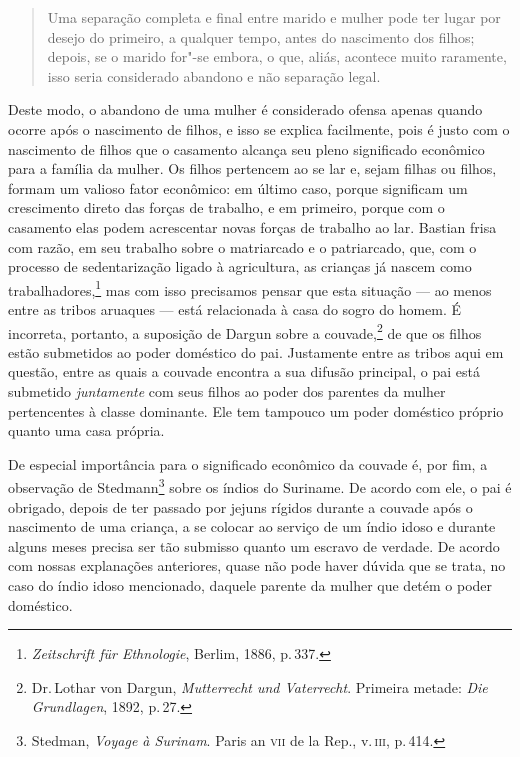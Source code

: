 \begin{quote}
Uma separação completa e
final entre marido e mulher pode ter lugar por desejo do primeiro, a
qualquer tempo, antes do nascimento dos filhos; depois, se o marido
for"-se embora, o que, aliás, acontece muito raramente, isso seria
considerado abandono e não separação legal. 
\end{quote}

Deste modo, o abandono de uma mulher é considerado ofensa apenas quando ocorre após o
nascimento de filhos, e isso se explica facilmente, pois é justo com
o nascimento de filhos que o casamento alcança seu pleno significado
econômico para a família da mulher. Os filhos pertencem ao se lar e, 
sejam filhas ou filhos, formam um valioso fator econômico: em
último caso, porque significam um crescimento direto das forças de
trabalho, e em primeiro, porque com o casamento elas podem acrescentar
novas forças de trabalho ao lar. Bastian frisa com razão, em seu
trabalho sobre o matriarcado e o patriarcado, que, com o processo de
sedentarização ligado à agricultura, as crianças já nascem como
trabalhadores,\footnote{\textit{Zeitschrift für Ethnologie}, Berlim, 1886,
  p.\,337.} mas com isso precisamos pensar que esta situação --- ao menos entre as
tribos aruaques --- está relacionada à casa do sogro do homem. É
incorreta, portanto, a suposição de Dargun sobre a couvade,\footnote{Dr.\,Lothar von Dargun,
  \textit{Mutterrecht und Vaterrecht}. Primeira metade:
  \textit{Die Grundlagen}, 1892, p.\,27.} de que os filhos estão
submetidos ao poder doméstico do pai. Justamente entre as tribos aqui em
questão, entre as quais a couvade encontra a sua difusão principal, o
pai está submetido \textit{juntamente} com seus filhos ao poder dos parentes da
mulher pertencentes à classe dominante. Ele tem tampouco um poder
doméstico próprio quanto uma casa própria.

De especial importância para o significado econômico da couvade é, por
fim, a observação de Stedmann\footnote{Stedman, \textit{Voyage à Surinam}.
  Paris an \textsc{vii} de la Rep., v.\,\textsc{iii}, p.\,414.} sobre os índios do
Suriname. De acordo com ele, o pai é obrigado, depois de ter passado por
jejuns rígidos durante a couvade após o nascimento de uma criança, a se
colocar ao serviço de um índio idoso e durante alguns meses precisa ser
tão submisso quanto um escravo de verdade. De acordo com nossas
explanações anteriores, quase não pode haver dúvida que se trata, no
caso do índio idoso mencionado, daquele parente da mulher que detém o
poder doméstico.

